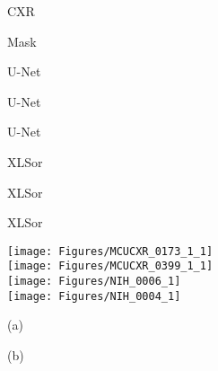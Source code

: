 \documentclass{midl} \usepackage{multirow}
\begin{document}
\begin{figure}[t!]
\tiny{
    \begin{minipage}[b]{0.12\linewidth}
		\centering
\centerline{CXR}
	\end{minipage}
	\begin{minipage}[b]{0.12\linewidth}
		\centering
\centerline{Mask}
	\end{minipage}
	\begin{minipage}[b]{0.12\linewidth}
		\centering
\centerline{U-Net}
	\end{minipage}
	\begin{minipage}[b]{0.12\linewidth}
		\centering
\centerline{U-Net}
	\end{minipage}
	\begin{minipage}[b]{0.11\linewidth}
		\centering
\centerline{U-Net}
	\end{minipage}
	\begin{minipage}[b]{0.12\linewidth}
		\centering
\centerline{XLSor}
	\end{minipage}
	\begin{minipage}[b]{0.11\linewidth}
		\centering
\centerline{XLSor}
	\end{minipage}
	\begin{minipage}[b]{0.12\linewidth}
		\centering
\centerline{XLSor}
	\end{minipage}}
	\begin{minipage}[b]{1.0\linewidth}
		\centering
		\texttt{[image: Figures/MCUCXR\_0173\_1\_1]} \\
		\vspace{0.05cm}
		\texttt{[image: Figures/MCUCXR\_0399\_1\_1]} \\
		\vspace{0.05cm}
		\texttt{[image: Figures/NIH\_0006\_1]} \\
		\vspace{0.05cm}
		\texttt{[image: Figures/NIH\_0004\_1]} \\
	\end{minipage}
\normalsize{
	\begin{minipage}[b]{0.122\linewidth}
		\centering
		\vspace{0.2cm}
		\centerline{(a)}\medskip
	\end{minipage}
	\begin{minipage}[b]{0.12\linewidth}
		\centering
		\vspace{0.2cm}
		\centerline{(b)}\medskip
	\end{minipage}
}
\end{figure}
\end{document}
